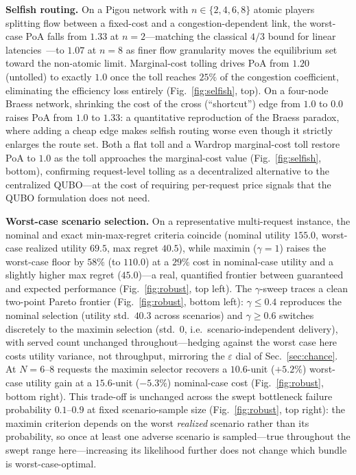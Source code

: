 \documentclass[twocolumn]{article}
\begin{document}
\textbf{Selfish routing.}  On a Pigou network with $n\in\{2,4,6,8\}$
atomic players splitting flow between a fixed-cost and a
congestion-dependent link, the worst-case PoA falls from $1.33$ at
$n{=}2$---matching the classical $4/3$ bound for linear
latencies~\cite{roughgarden2002bad}---to $1.07$ at $n{=}8$ as finer
flow granularity moves the equilibrium set toward the non-atomic
limit.  Marginal-cost tolling drives PoA from $1.20$ (untolled) to
exactly $1.0$ once the toll reaches $25\%$ of the congestion
coefficient, eliminating the efficiency loss entirely
(Fig.~\ref{fig:selfish}, top).  On a four-node Braess network,
shrinking the cost of the cross (``shortcut'') edge from $1.0$ to
$0.0$ raises PoA from $1.0$ to $1.33$: a quantitative reproduction of
the Braess paradox, where adding a cheap edge makes selfish routing
worse even though it strictly enlarges the route set.  Both a flat
toll and a Wardrop marginal-cost toll restore PoA to $1.0$ as the toll
approaches the marginal-cost value (Fig.~\ref{fig:selfish}, bottom),
confirming request-level tolling as a decentralized alternative to the
centralized QUBO---at the cost of requiring per-request price signals
that the QUBO formulation does not need.

\textbf{Worst-case scenario selection.}  On a representative
multi-request instance, the nominal and exact min-max-regret criteria
coincide (nominal utility $155.0$, worst-case realized utility $69.5$,
max regret $40.5$), while maximin ($\gamma{=}1$) raises the worst-case
floor by $58\%$ (to $110.0$) at a $29\%$ cost in nominal-case utility
and a slightly higher max regret ($45.0$)---a real, quantified
frontier between guaranteed and expected performance
(Fig.~\ref{fig:robust}, top left).  The $\gamma$-sweep traces a clean
two-point Pareto frontier (Fig.~\ref{fig:robust}, bottom left):
$\gamma \le 0.4$ reproduces the nominal selection (utility std.\
$40.3$ across scenarios) and $\gamma \ge 0.6$ switches discretely to
the maximin selection (std.\ $0$, i.e.\ scenario-independent
delivery), with served count unchanged throughout---hedging against
the worst case here costs utility variance, not throughput, mirroring
the $\varepsilon$ dial of Sec.~\ref{sec:chance}.  At $N{=}6$--$8$
requests the maximin selector recovers a $10.6$-unit ($+5.2\%$)
worst-case utility gain at a $15.6$-unit ($-5.3\%$) nominal-case cost
(Fig.~\ref{fig:robust}, bottom right).  This trade-off is unchanged
across the swept bottleneck failure probability $0.1$--$0.9$ at fixed
scenario-sample size (Fig.~\ref{fig:robust}, top right): the maximin
criterion depends on the worst \emph{realized} scenario rather than
its probability, so once at least one adverse scenario is
sampled---true throughout the swept range here---increasing its
likelihood further does not change which bundle is worst-case-optimal.
\end{document}
